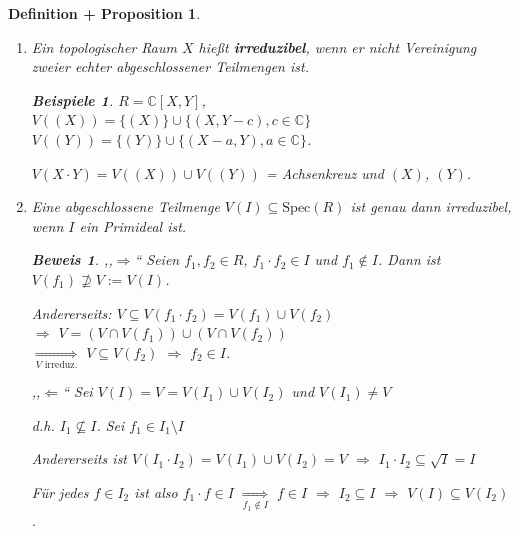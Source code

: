 \documentclass[a4paper,12pt]{scrbook}
\theoremstyle{break}
\newtheorem{DefProp}[Def]{Definition + Proposition}
\theoremstyle{nonumberbreak}
\newtheorem{Bew}{Beweis}
\newtheorem{nnBsp}{Beispiele}
\theoremstyle{nonumberplain}
\newcommand{\emp}[1]{\textbf{\emph{#1}}}
\begin{document}
\begin{DefProp}

\begin{enumerate}
\item[a)] Ein topologischer Raum $X$ hießt \emp{irreduzibel}, wenn er nicht Vereinigung zweier echter abgeschlossener Teilmengen ist.

\begin{nnBsp}
$R = \mathbb{C}[X,Y]$,\\
$V((X)) = \{ (X) \} \cup \{ (X, Y - c), c \in \mathbb{C} \}$\\
$V((Y)) = \{ (Y) \} \cup \{ (X -a, Y), a \in \mathbb{C} \}$.

$V(X \cdot Y) = V( (X) ) \cup V( (Y) )$ = Achsenkreuz und $(X)$, $(Y)$.
\end{nnBsp}

\item[b)] Eine abgeschlossene Teilmenge $V(I) \subseteq \textrm{Spec}(R)$ ist genau dann irreduzibel, wenn $I$ ein Primideal ist.

\begin{Bew}
,,$\Rightarrow$`` Seien $f_1, f_2 \in R$, $f_1 \cdot f_2 \in I$ und $f_1 \notin I$. Dann ist $V(f_1) \nsupseteq V := V(I)$.

Andererseits: $V \subseteq V(f_1 \cdot f_2) = V(f_1) \cup V(f_2)$\\
$\Rightarrow$ $V = (V \cap V(f_1)) \cup (V \cap V(f_2))$\\
$\underset{V \text{ irreduz.}}\Longrightarrow$ $V \subseteq V(f_2)$ $\Rightarrow$ $f_2 \in I$.

,,$\Leftarrow$`` Sei $V(I) = V = V(I_1) \cup V(I_2)$ und $V(I_1) \neq V$

d.h. $I_1 \nsubseteq I$. Sei $f_1 \in I_1 \setminus I$

Andererseits ist $V(I_1 \cdot I_2) = V(I_1) \cup V(I_2) = V$ $\Rightarrow$ $I_1 \cdot I_2 \subseteq \sqrt{I} = I$

Für jedes $f \in I_2$ ist also $f_1 \cdot f \in I$ $\underset{f_1 \notin I}\Rightarrow$ $f \in I$ $\Rightarrow$ $I_2 \subseteq I$ $\Rightarrow$ $V(I) \subseteq V(I_2)$.

\end{Bew}

\end{enumerate}

\end{DefProp}
\end{document}
